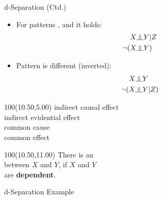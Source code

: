 \begin{frame}{d-Separation (Ctd.)}{}
	\begin{itemize}
		\item For patterns ,  and  it holds:
		\begin{align*}
			X &\indep Y \vert Z \\
			\neg (X &\indep Y)
		\end{align*}
		\item Pattern  is different (inverted):
		\begin{align*}
			X &\indep Y \\
			\neg (X &\indep Y \vert Z)
		\end{align*}
	\end{itemize}

	\begin{textblock}{100}(10.50,5.00)
      		\footnotesize
		 indirect causal effect \\
		 indirect evidential effect \\
		 common cause \\
		 common effect
    	\end{textblock}

	\begin{textblock}{100}(10.50,11.00)
      		\footnotesize
		There is an  \\
		between $X$ and $Y$, if $X$ and $Y$ \\
		are \textbf{dependent}.
    	\end{textblock}
\end{frame}


\begin{frame}{d-Separation Example}{}
\end{frame}


